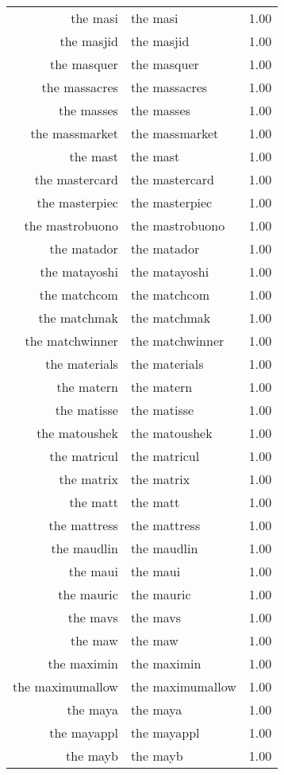 \begin{table}[ht]
\begin{tabular}{rlr}
  the masi & the masi & 1.00 \\ 
  the masjid & the masjid & 1.00 \\ 
  the masquer & the masquer & 1.00 \\ 
  the massacres & the massacres & 1.00 \\ 
  the masses & the masses & 1.00 \\ 
  the massmarket & the massmarket & 1.00 \\ 
  the mast & the mast & 1.00 \\ 
  the mastercard & the mastercard & 1.00 \\ 
  the masterpiec & the masterpiec & 1.00 \\ 
  the mastrobuono & the mastrobuono & 1.00 \\ 
  the matador & the matador & 1.00 \\ 
  the matayoshi & the matayoshi & 1.00 \\ 
  the matchcom & the matchcom & 1.00 \\ 
  the matchmak & the matchmak & 1.00 \\ 
  the matchwinner & the matchwinner & 1.00 \\ 
  the materials & the materials & 1.00 \\ 
  the matern & the matern & 1.00 \\ 
  the matisse & the matisse & 1.00 \\ 
  the matoushek & the matoushek & 1.00 \\ 
  the matricul & the matricul & 1.00 \\ 
  the matrix & the matrix & 1.00 \\ 
  the matt & the matt & 1.00 \\ 
  the mattress & the mattress & 1.00 \\ 
  the maudlin & the maudlin & 1.00 \\ 
  the maui & the maui & 1.00 \\ 
  the mauric & the mauric & 1.00 \\ 
  the mavs & the mavs & 1.00 \\ 
  the maw & the maw & 1.00 \\ 
  the maximin & the maximin & 1.00 \\ 
  the maximumallow & the maximumallow & 1.00 \\ 
  the maya & the maya & 1.00 \\ 
  the mayappl & the mayappl & 1.00 \\ 
  the mayb & the mayb & 1.00 \\ 

\end{tabular}
\end{table}
